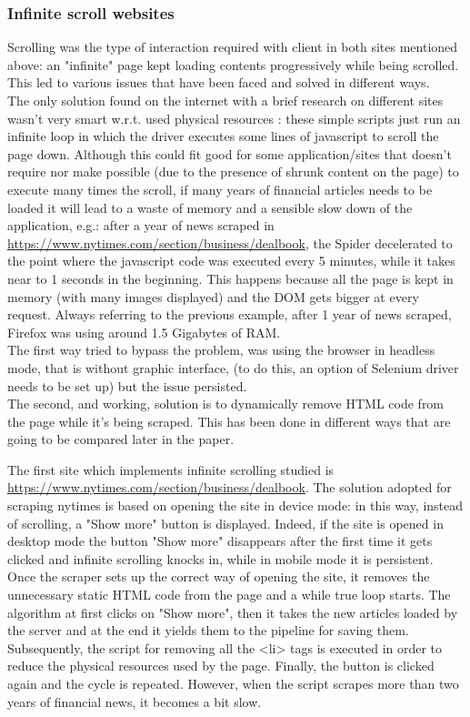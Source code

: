 \subsubsection{Infinite scroll websites}
Scrolling was the type of interaction required with client in both sites mentioned above: an "infinite" page kept loading contents progressively while being scrolled. This led to various issues that have been faced and solved in different ways. \\
The only solution found on the internet with a brief research on different sites wasn't very smart w.r.t. used physical resources \cite{currentscrollsolution}: these simple scripts just run an infinite loop in which the driver executes some lines of javascript to scroll the page down. Although this could fit good for some application/sites that doesn't require nor make possible (due to the presence of shrunk content on the page) to execute many times the scroll, if many years of financial articles needs to be loaded it will lead to a waste of memory and a sensible slow down of the application, e.g.:  after a year of news scraped in \url{https://www.nytimes.com/section/business/dealbook}, the Spider decelerated to the point where the javascript code was executed every 5 minutes, while it takes near to 1 seconds in the beginning. This happens because all the page is kept in memory (with many images displayed) and the DOM gets bigger at every request. Always referring to the previous example, after 1 year of news scraped, Firefox was using around 1.5 Gigabytes of RAM. \\
The first way tried to bypass the problem, was using the browser in headless mode, that is without graphic interface, (to do this, an option of Selenium driver needs to be set up) but the issue persisted. \\
The second, and working, solution is to dynamically remove HTML code from the page while it's being scraped. This has been done in different ways that are going to be compared later in the paper. 
\par 
The first site which implements infinite scrolling studied is \url{https://www.nytimes.com/section/business/dealbook}. The solution adopted for scraping nytimes is based on opening the site in device mode: in this way, instead of scrolling, a "Show more" button is displayed. Indeed, if the site is opened in desktop mode the button "Show more" disappears after the first time it gets clicked and infinite scrolling knocks in, while in mobile mode it is persistent. Once the scraper sets up the correct way of opening the site, it removes the unnecessary static HTML code from the page and a while true loop starts. The algorithm at first clicks on "Show more", then it takes the new articles loaded by the server and at the end it yields them to the pipeline for saving them. Subsequently, the script for removing all the <li> tags is executed in order to reduce the physical resources used by the page. Finally, the button is clicked again and the cycle is repeated. However, when the script scrapes more than two years of financial news, it becomes a bit slow. 
